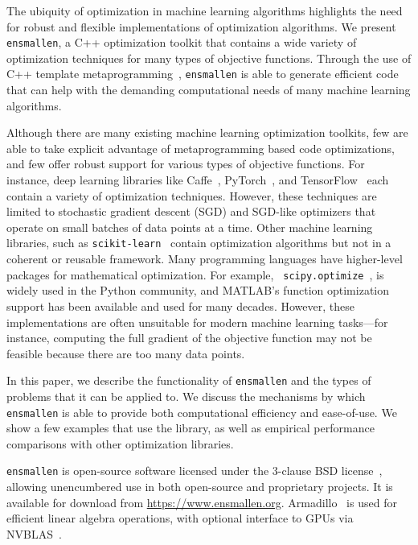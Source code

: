 \documentclass{article}
\begin{document}
The ubiquity of optimization in machine learning algorithms highlights the need
for robust and flexible implementations of optimization algorithms.
We present {\tt ensmallen}, a C++ optimization toolkit
that contains a wide variety of optimization techniques for many types of
objective functions.  Through the use of C++ template
metaprogramming~\cite{Abrahams_2004},
{\tt ensmallen} is able to generate efficient code that can help with the
demanding computational needs of many machine learning algorithms.

Although there are many existing machine learning optimization toolkits, few
are able to take explicit advantage of metaprogramming based code optimizations,
and few offer robust support for various types of objective functions.
For instance, deep learning
libraries like Caffe~\cite{jia2014caffe},
PyTorch~\cite{paszke2017automatic},
and TensorFlow~\cite{abadi2016tensorflow}
each contain a variety of optimization techniques.  However, these techniques are
limited to stochastic gradient descent (SGD) and SGD-like optimizers that
operate on small batches of data points at a time.  Other machine learning
libraries, such as {\tt scikit-learn}~\cite{pedregosa2011scikit}
contain optimization algorithms but not in a coherent or reusable framework.
Many programming languages have higher-level packages for
mathematical optimization.  For example, {\tt
scipy.optimize}~\cite{jones2014scipy},
is widely used in the Python community, and MATLAB's function optimization
support has been available and used for many decades.
However, these
implementations are often unsuitable for modern machine learning tasks---for
instance, computing the full gradient of the objective function may not be
feasible because there are too many data points.

In this paper, we describe the functionality of {\tt ensmallen} and the types of
problems that it can be applied to.  We discuss the mechanisms by which {\tt ensmallen} is
able to provide both computational efficiency and ease-of-use.
We show a few examples that use the library, as well as empirical performance comparisons
with other optimization libraries.

{\tt ensmallen} is open-source software licensed under the 3-clause BSD
license~\cite{Rosen_2004_full}, 
allowing unencumbered use in both open-source and proprietary projects.
It is available for download from \url{https://www.ensmallen.org}.
Armadillo~\cite{sanderson2016armadillo} is used for efficient linear algebra operations,
with optional interface to GPUs via NVBLAS~\cite{nvidia2015}.
\end{document}
